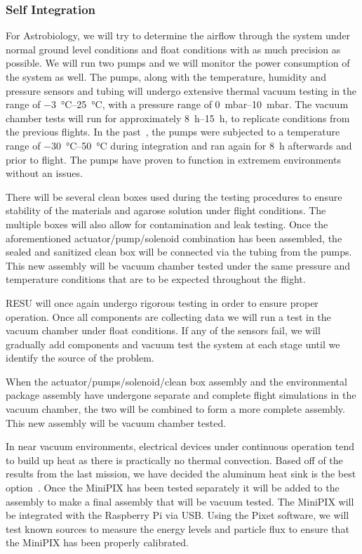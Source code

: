 \subsubsection{Self Integration}
For Astrobiology, we will try to determine the airflow through the system under normal ground level conditions and float conditions with as much precision as possible.  We will run two pumps and we will monitor the power consumption of the system as well. The pumps, along with the temperature, humidity and pressure sensors and tubing will undergo extensive thermal vacuum testing in the range of \SIrange{-3}{25}{\celsius}, with a pressure range of \SIrange{0}{10}{\milli\bar}. The vacuum chamber tests will run for approximately \SIrange{8}{15}{\hour}, to replicate conditions from the previous flights. In the past~\cite{SORA}, the pumps were subjected to a temperature range of \SIrange{-30}{50}{\celsius} during integration and ran again for \SI{8}{\hour} afterwards and prior to flight. The pumps have proven to function in extremem environments without an issues. 

There will be several clean boxes used during the testing procedures to ensure stability of the materials and agarose solution under flight conditions. The multiple boxes will also allow for contamination and leak testing. Once the aforementioned actuator/pump/solenoid combination has been assembled, the sealed and sanitized clean box will be connected via the tubing from the pumps. This new assembly will be vacuum chamber tested under the same pressure and temperature conditions that are to be expected throughout the flight. 

RESU will once again undergo rigorous testing in order to ensure proper operation. Once all components are collecting data we will run a test in the vacuum chamber under float conditions. If any of the sensors fail, we will gradually add components and vacuum test the system at each stage until we identify the source of the problem.

When the actuator/pumps/solenoid/clean box assembly and the environmental package assembly have undergone separate and complete flight simulations in the vacuum chamber, the two will be combined to form a more complete assembly. This new assembly will be vacuum chamber tested. 

In near vacuum environments, electrical devices under continuous operation tend to build up heat as there is practically no thermal convection. Based off of the results from the last mission, we have decided the aluminum heat sink is the best option~\cite{SORA}. Once the MiniPIX has been tested separately it will be added to the assembly to make a final assembly that will be vacuum tested. The MiniPIX will be integrated with the Raspberry Pi via USB. Using the Pixet software, we will test known sources to measure the energy levels and particle flux to ensure that the MiniPIX has been properly calibrated.
    
